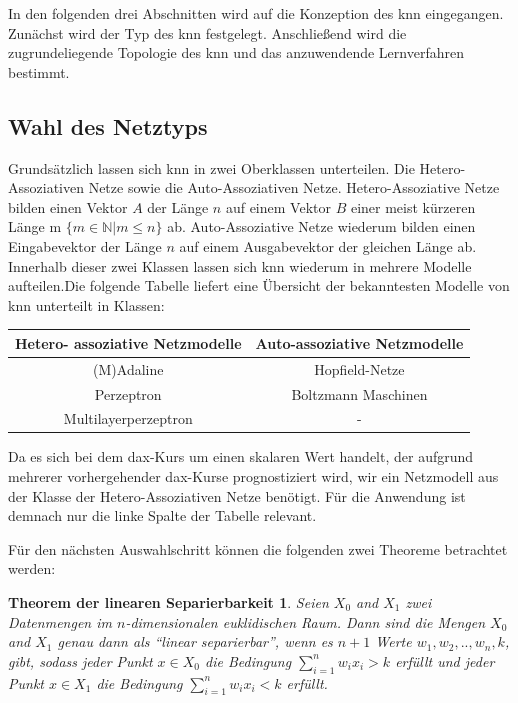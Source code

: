 In den folgenden drei Abschnitten wird auf die Konzeption des \ac{knn} eingegangen. Zunächst wird der Typ des \ac{knn} festgelegt. Anschließend wird die zugrundeliegende Topologie des \ac{knn} und das anzuwendende Lernverfahren bestimmt.

\subsection{Wahl des Netztyps}
\label{subsection:Wahl des Netztyps}

Grundsätzlich lassen sich \ac{knn} in zwei Oberklassen unterteilen. Die Hetero-Assoziativen Netze sowie die Auto-Assoziativen Netze. Hetero-Assoziative Netze bilden einen Vektor $A$ der Länge $n$ auf einem Vektor $B$ einer meist kürzeren Länge m $\{m \in \mathbb{N} | m \le n\}$ ab. Auto-Assoziative Netze wiederum bilden einen Eingabevektor der Länge $n$ auf einem Ausgabevektor der gleichen Länge ab. Innerhalb dieser zwei Klassen lassen sich \ac{knn} wiederum in mehrere Modelle aufteilen.Die folgende Tabelle liefert eine Übersicht der bekanntesten Modelle von \ac{knn} unterteilt in Klassen:

\begin{center}
\begin{tabular}{|c|c|}
\hline 
 Hetero- assoziative Netzmodelle & Auto-assoziative Netzmodelle \\ 
\hline 
(M)Adaline & Hopfield-Netze \\ 
\hline  
Perzeptron &  Boltzmann Maschinen \\ 
\hline 
Multilayerperzeptron & - \\ 
\hline 
\end{tabular} 
\end{center}

Da es sich bei dem \ac{dax}-Kurs um einen skalaren Wert handelt, der aufgrund mehrerer vorhergehender \ac{dax}-Kurse prognostiziert wird, wir ein Netzmodell aus der Klasse der Hetero-Assoziativen Netze benötigt. Für die Anwendung ist demnach nur die linke Spalte der Tabelle relevant. 

Für den nächsten Auswahlschritt können die folgenden zwei Theoreme betrachtet werden:

\newtheorem*{theorem2*}{Theorem der linearen Separierbarkeit}
\begin{theorem2*}
Seien $X_{0}$ and $X_{1}$ zwei Datenmengen im $n$-dimensionalen euklidischen Raum. Dann sind die Mengen $X_{0}$ and $X_{1}$ genau dann als "`linear separierbar"', wenn es  $n+1$ Werte $w_{1}, w_{2},..,w_{n}, k$, gibt, sodass jeder Punkt  $x \in X_{0}$ die Bedingung $\sum^{n}_{i=1} w_{i}x_{i} > k$ erfüllt und jeder Punkt $x \in X_{1}$ die Bedingung $\sum^{n}_{i=1} w_{i}x_{i} < k$ erfüllt.
\end{theorem2*}

